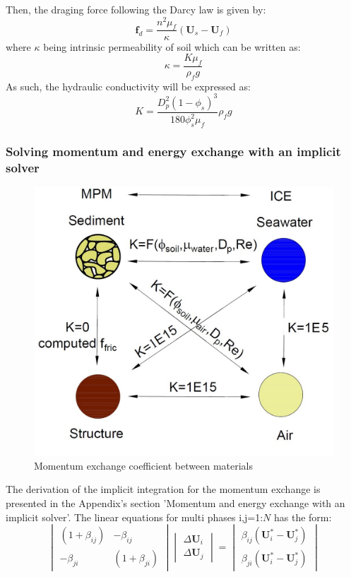 \documentclass[preprint,12pt]{elsarticle}
\begin{document}
%
%
Then, the draging force following the Darcy law is given by:
%
%
\begin{equation}
     \pmb{f}_{d} =  \frac{n^2 \mu_f}{ \kappa}(\pmb{U}_s - \pmb{U}_f)  
\end {equation}
%
%
where $\kappa$ being intrinsic permeability of soil which can be written as:
%
%
\begin{equation}
     \kappa  =  \frac{K \mu_f}{\rho_f  g}
\end {equation}
%
%
As such, the hydraulic conductivity will be expressed as:
%
%
\begin{equation}
    K = \frac{D_p^2 (1-\phi_s)^3}{180 \phi_s^2 \mu_f} \rho_f  g
\end {equation}
%
%

\subsubsection{Solving momentum and energy exchange with an implicit solver}
%
%
\begin{figure}[h]
\center
\includegraphics[scale=1.0]{K.jpg}
\caption{Momentum exchange coefficient between materials}
\label{fig:K}
\end {figure}
%
%
The derivation of the implicit integration for the momentum exchange is presented in the Appendix's section 'Momentum and energy exchange with an implicit solver'. The linear equations for multi phases i,j=1:$N$
has the form:
%
\[ \begin{vmatrix} (1 + \beta_{ij})  &  -\beta_{ij} \\
                  -\beta_{ji}       &  (1 + \beta_{ji})
    \end {vmatrix}
    \begin{vmatrix} \Delta \pmb{U}_{i} \\
                    \Delta \pmb{U}_{j}
    \end {vmatrix}
    =
    \begin{vmatrix}  \beta_{ij}(\pmb{U}_{i}^{*} - \pmb{U}_{j}^{*}) \\
                    \beta_{ji}(\pmb{U}_{i}^{*} - \pmb{U}_{j}^{*})
    \end {vmatrix}                
\]
\end{document}
